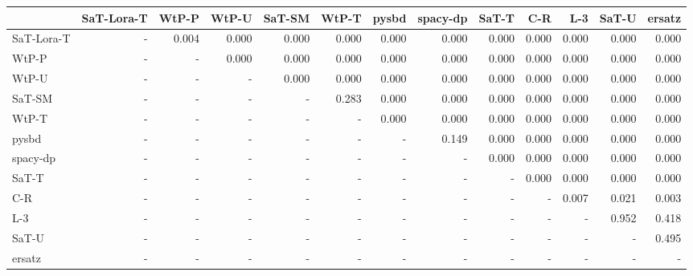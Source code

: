 \begin{tabular}{lrrrrrrrrrrrr}
\toprule
 & SaT-Lora-T & WtP-P & WtP-U & SaT-SM & WtP-T & pysbd & spacy-dp & SaT-T & C-R & L-3 & SaT-U & ersatz \\
\midrule
SaT-Lora-T & - & 0.004 & 0.000 & 0.000 & 0.000 & 0.000 & 0.000 & 0.000 & 0.000 & 0.000 & 0.000 & 0.000 \\
WtP-P & - & - & 0.000 & 0.000 & 0.000 & 0.000 & 0.000 & 0.000 & 0.000 & 0.000 & 0.000 & 0.000 \\
WtP-U & - & - & - & 0.000 & 0.000 & 0.000 & 0.000 & 0.000 & 0.000 & 0.000 & 0.000 & 0.000 \\
SaT-SM & - & - & - & - & 0.283 & 0.000 & 0.000 & 0.000 & 0.000 & 0.000 & 0.000 & 0.000 \\
WtP-T & - & - & - & - & - & 0.000 & 0.000 & 0.000 & 0.000 & 0.000 & 0.000 & 0.000 \\
pysbd & - & - & - & - & - & - & 0.149 & 0.000 & 0.000 & 0.000 & 0.000 & 0.000 \\
spacy-dp & - & - & - & - & - & - & - & 0.000 & 0.000 & 0.000 & 0.000 & 0.000 \\
SaT-T & - & - & - & - & - & - & - & - & 0.000 & 0.000 & 0.000 & 0.000 \\
C-R & - & - & - & - & - & - & - & - & - & 0.007 & 0.021 & 0.003 \\
L-3 & - & - & - & - & - & - & - & - & - & - & 0.952 & 0.418 \\
SaT-U & - & - & - & - & - & - & - & - & - & - & - & 0.495 \\
ersatz & - & - & - & - & - & - & - & - & - & - & - & - \\
\bottomrule
\end{tabular}

